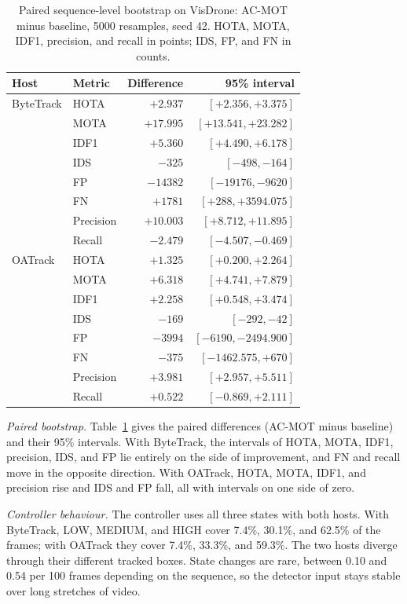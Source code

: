 \documentclass[pdflatex,sn-mathphys-num,iicol]{sn-jnl}
\begin{document}
\begin{table}[t]
\caption{Paired sequence-level bootstrap on VisDrone: AC-MOT minus baseline,
5000 resamples, seed 42. HOTA, MOTA, IDF1, precision, and recall in points;
IDS, FP, and FN in counts.}
\label{tab:bootstrap}
\centering\footnotesize
\setlength{\tabcolsep}{4pt}
\begin{tabular}{@{}llrr@{}}
\toprule
Host & Metric & Difference & 95\% interval\\
\midrule
ByteTrack & HOTA & $+2.937$ & $[+2.356, +3.375]$\\
 & MOTA & $+17.995$ & $[+13.541, +23.282]$\\
 & IDF1 & $+5.360$ & $[+4.490, +6.178]$\\
 & IDS & $-325$ & $[-498, -164]$\\
 & FP & $-14382$ & $[-19176, -9620]$\\
 & FN & $+1781$ & $[+288, +3594.075]$\\
 & Precision & $+10.003$ & $[+8.712, +11.895]$\\
 & Recall & $-2.479$ & $[-4.507, -0.469]$\\
\midrule
OATrack & HOTA & $+1.325$ & $[+0.200, +2.264]$\\
 & MOTA & $+6.318$ & $[+4.741, +7.879]$\\
 & IDF1 & $+2.258$ & $[+0.548, +3.474]$\\
 & IDS & $-169$ & $[-292, -42]$\\
 & FP & $-3994$ & $[-6190, -2494.900]$\\
 & FN & $-375$ & $[-1462.575, +670]$\\
 & Precision & $+3.981$ & $[+2.957, +5.511]$\\
 & Recall & $+0.522$ & $[-0.869, +2.111]$\\
\bottomrule
\end{tabular}
\end{table}

\emph{Paired bootstrap.} Table~\ref{tab:bootstrap} gives the paired differences (AC-MOT minus baseline)
and their 95\% intervals. With ByteTrack, the intervals of HOTA, MOTA, IDF1,
precision, IDS, and FP lie entirely on the side of improvement, and FN and
recall move in the opposite direction. With OATrack, HOTA, MOTA, IDF1, and
precision rise and IDS and FP fall, all with intervals on one side of zero.

\emph{Controller behaviour.} The controller uses all three states with both hosts. With ByteTrack, LOW,
MEDIUM, and HIGH cover 7.4\%, 30.1\%, and 62.5\% of the frames; with OATrack
they cover 7.4\%, 33.3\%, and 59.3\%. The two hosts diverge through their
different tracked boxes. State changes are rare, between 0.10 and 0.54 per 100
frames depending on the sequence, so the detector input stays stable over
long stretches of video.
\end{document}
